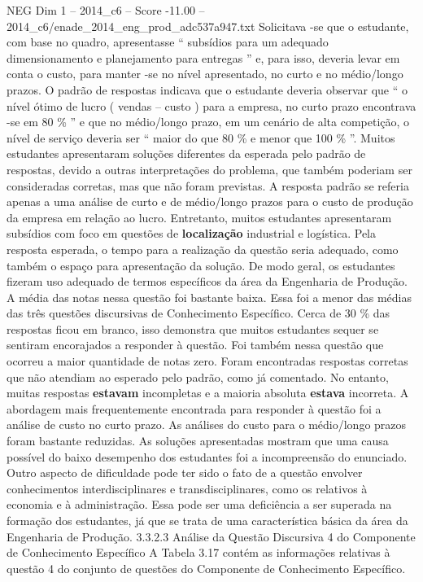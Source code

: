 \begin{textsample}{NEG Dim 1 – 2014\_c6 – Score -11.00 – 2014\_c6/enade\_2014\_eng\_prod\_adc537a947.txt}
Solicitava -se que o estudante, com base no quadro, apresentasse “ subsídios para um adequado dimensionamento e planejamento para entregas ” e, para isso, deveria levar em conta o custo, para manter -se no nível apresentado, no curto e no médio/longo prazos.
O padrão de respostas indicava que o estudante deveria observar que “ o nível ótimo de lucro ( vendas – custo ) para a empresa, no curto prazo encontrava -se em 80 \% ” e que no médio/longo prazo, em um cenário de alta competição, o nível de serviço deveria ser “ maior do que 80 \% e menor que 100 \% ”.
Muitos estudantes apresentaram soluções diferentes da esperada pelo padrão de respostas, devido a outras interpretações do problema, que também poderiam ser consideradas corretas, mas que não foram previstas.
A resposta padrão se referia apenas a uma análise de curto e de médio/longo prazos para o custo de produção da empresa em relação ao lucro.
Entretanto, muitos estudantes apresentaram subsídios com foco em questões de \textbf{localização} industrial e logística.
Pela resposta esperada, o tempo para a realização da questão seria adequado, como também o espaço para apresentação da solução.
De modo geral, os estudantes fizeram uso adequado de termos específicos da área da Engenharia de Produção.
A média das notas nessa questão foi bastante baixa.
Essa foi a menor das médias das três questões discursivas de Conhecimento Específico.
Cerca de 30 \% das respostas ficou em branco, isso demonstra que muitos estudantes sequer se sentiram encorajados a responder à questão.
Foi também nessa questão que ocorreu a maior quantidade de notas zero.
Foram encontradas respostas corretas que não atendiam ao esperado pelo padrão, como já comentado.
No entanto, muitas respostas \textbf{estavam} incompletas e a maioria absoluta \textbf{estava} incorreta.
A abordagem mais frequentemente encontrada para responder à questão foi a análise de custo no curto prazo.
As análises do custo para o médio/longo prazos foram bastante reduzidas.
As soluções apresentadas mostram que uma causa possível do baixo desempenho dos estudantes foi a incompreensão do enunciado.
Outro aspecto de dificuldade pode ter sido o fato de a questão envolver conhecimentos interdisciplinares e transdisciplinares, como os relativos à economia e à administração.
Essa pode ser uma deficiência a ser superada na formação dos estudantes, já que se trata de uma característica básica da área da Engenharia de Produção. 3.3.2.3 Análise da Questão Discursiva 4 do Componente de Conhecimento Específico A Tabela 3.17 contém as informações relativas à questão 4 do conjunto de questões do Componente de Conhecimento Específico.

\end{textsample}
